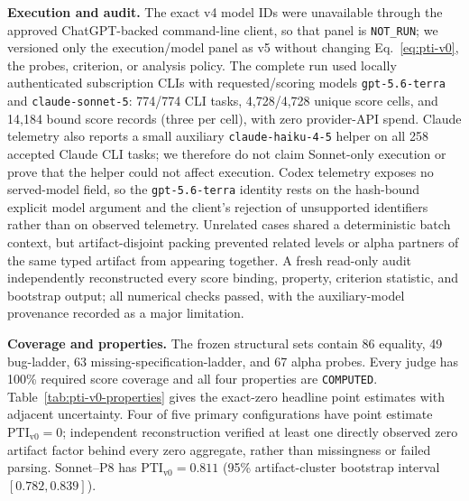 \documentclass{article}
\newcommand{\PTI}{\mathrm{PTI}}                  %
\newcommand{\PTIvzero}{\PTI_{\mathrm{v0}}}        %
\begin{document}
\textbf{Execution and audit.}
The exact v4 model IDs were unavailable through the approved ChatGPT-backed command-line client, so that panel is \texttt{NOT\_RUN}; we versioned only the execution/model panel as v5 without changing Eq.~\ref{eq:pti-v0}, the probes, criterion, or analysis policy. The complete run used locally authenticated subscription CLIs with requested/scoring models \texttt{gpt-5.6-terra} and \texttt{claude-sonnet-5}: 774/774 CLI tasks, 4,728/4,728 unique score cells, and 14,184 bound score records (three per cell), with zero provider-API spend. Claude telemetry also reports a small auxiliary \texttt{claude-haiku-4-5} helper on all 258 accepted Claude CLI tasks; we therefore do not claim Sonnet-only execution or prove that the helper could not affect execution. Codex telemetry exposes no served-model field, so the \texttt{gpt-5.6-terra} identity rests on the hash-bound explicit model argument and the client's rejection of unsupported identifiers rather than on observed telemetry. Unrelated cases shared a deterministic batch context, but artifact-disjoint packing prevented related levels or alpha partners of the same typed artifact from appearing together. A fresh read-only audit independently reconstructed every score binding, property, criterion statistic, and bootstrap output; all numerical checks passed, with the auxiliary-model provenance recorded as a major limitation.

\textbf{Coverage and properties.}
The frozen structural sets contain 86 equality, 49 bug-ladder, 63 missing-specification-ladder, and 67 alpha probes. Every judge has 100\% required score coverage and all four properties are \texttt{COMPUTED}. Table~\ref{tab:pti-v0-properties} gives the exact-zero headline point estimates with adjacent uncertainty. Four of five primary configurations have point estimate $\PTIvzero=0$; independent reconstruction verified at least one directly observed zero artifact factor behind every zero aggregate, rather than missingness or failed parsing. Sonnet--P8 has $\PTIvzero=0.811$ (95\% artifact-cluster bootstrap interval $[0.782,0.839]$).
\end{document}
